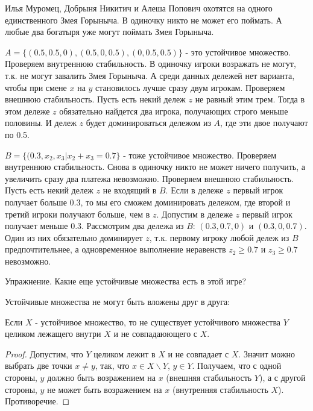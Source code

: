 \begin{myex}
Илья Муромец, Добрыня Никитич и Алеша Попович охотятся на одного единственного Змея Горыныча. В одиночку никто не может его поймать. А любые два богатыря уже могут поймать Змея Горыныча.

$A=\{(0.5,0.5,0),(0.5,0,0.5),(0,0.5,0.5)\}$ - это устойчивое множество. Проверяем внутреннюю стабильность. В одиночку игроки возражать не могут, т.к. не могут завалить Змея Горыныча. А среди данных дележей нет варианта, чтобы при смене $x$ на $y$ становилось лучше сразу двум игрокам. Проверяем внешнюю стабильность. Пусть есть некий дележ $z$ не равный этим трем. Тогда в этом дележе $z$ обязательно найдется два игрока, получающих строго меньше половины. И дележ $z$ будет доминироваться дележом из $A$, где эти двое получают по 0.5.

$B=\{(0.3,x_{2},x_{3}|x_{2}+x_{3}=0.7\}$ - тоже устойчивое множество. Проверяем внутреннюю стабильность. Снова в одиночку никто не может ничего получить, а увеличить сразу два платежа невозможно. Проверяем внешнюю стабильность. Пусть есть некий дележ $z$ не входящий в $B$. Если в дележе $z$ первый игрок получает больше 0.3, то мы его сможем доминировать дележом, где второй и третий игроки получают больше, чем в $z$. Допустим в дележе $z$ первый игрок получает меньше 0.3. Рассмотрим два дележа из $B$: $(0.3,0.7,0)$ и $(0.3,0,0.7)$. Один из них обязательно доминирует $z$, т.к. первому игроку любой дележ из $B$ предпочтительнее, а одновременное выполнение неравенств $z_{2}\geq 0.7$ и $z_{3}\geq 0.7$ невозможно.

Упражнение. Какие еще устойчивые множества есть в этой игре?
\end{myex}

Устойчивые множества не могут быть вложены друг в друга:
\begin{myth}
Если $X$ - устойчивое множество, то не существует устойчивого множества $Y$ целиком лежащего внутри $X$ и не совпадаюющего с $X$.
\end{myth}
\begin{proof}
Допустим, что $Y$ целиком лежит в $X$ и не совпадает с $X$. Значит можно выбрать две точки $x\neq y$, так, что $x\in X\backslash Y$, $y\in Y$. Получаем, что с одной стороны, $y$ должно быть возражением на $x$ (внешняя стабильность $Y$), а с другой стороны, $y$ не может быть возражением на $x$ (внутренняя стабильность $X$). Противоречие.
\end{proof}


